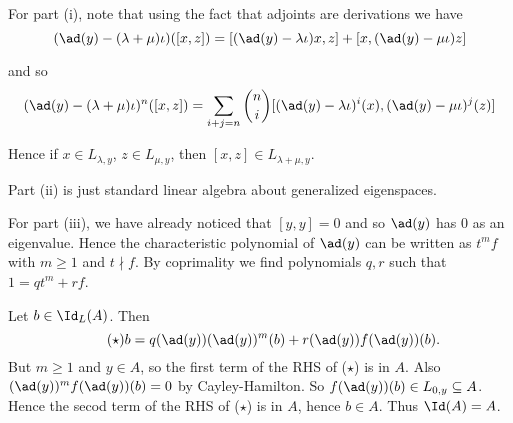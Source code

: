 For part (i), note that using the fact that adjoints are
derivations we have
\[ (\ad(y) - (\lambda+\mu)\iota)([x, z]) = [(\ad(y) - \lambda\iota)x, z] +
		[x, (\ad(y)-\mu\iota)z] \]

and so
\[ (\ad(y) - (\lambda + \mu)\iota)^n([x, z]) = \sum_{i + j = n}\binom{n}{i}[(\ad(y) - \lambda\iota)^i(x), (\ad(y) - \mu\iota)^j(z)] \]

Hence if $x \in L_{\lambda, y}$, $z \in L_{\mu, y}$, then
$[x, z] \in L_{\lambda + \mu, y}$.

Part (ii) is just standard linear algebra about generalized eigenspaces.

For part (iii), we have already noticed that $[y, y] = 0$ and so $\ad(y)$
has $0$ as an eigenvalue. Hence the characteristic polynomial of $\ad(y)$ can
be written as $t^mf$ with $m\geq 1$ and $t\nmid f$. By coprimality we find
polynomials $q, r$ such that $1 = qt^m + rf$.

Let $b \in \Id_L(A)$. Then
\begin{equation*}\tag{$\star$}
b = q(\ad(y))(\ad(y))^m(b) + r(\ad(y))f(\ad(y))(b).
\end{equation*}
But $m\geq 1$ and $y \in A$, so the first term of the RHS of ($\star$) is in $A$.
Also $(\ad(y))^mf(\ad(y))(b) = 0$ by Cayley-Hamilton. So
$f(\ad(y))(b) \in L_{0, y} \subseteq A$. Hence the secod term of the RHS of
($\star$) is in $A$, hence $b \in A$. Thus $\Id(A) = A$.
